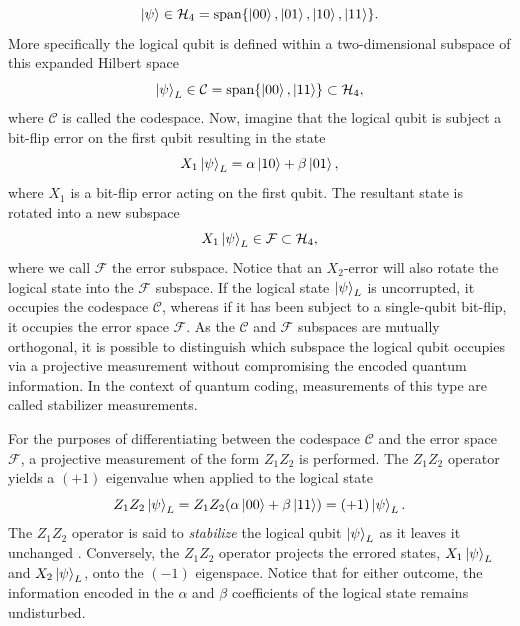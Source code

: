 \documentclass[]{arxiv}
\theoremstyle{plain}%
\theoremstyle{definition}
\theoremstyle{remark}
\begin{document}
%
\begin{equation}
\ket{\psi}\in \mathcal{H}_4 =\text{span}\{\ket{00},\ket{01},\ket{10},\ket{11}\}\rm.
\end{equation}
%
More specifically the logical qubit is defined within a two-dimensional subspace of this expanded Hilbert space
%
\begin{equation}
\ket{\psi}_L\in\mathcal{C} = {\rm span}\{\ket{00},\ket{11}\} \subset \mathcal{H}_4\rm,
\end{equation}
%
where $\mathcal{C}$ is called the codespace. Now, imagine that the logical qubit is subject a bit-flip error on the first qubit resulting in the state
%
\begin{equation}
X_1 \ket{\psi}_L=\alpha \ket{10} + \beta \ket{01}\rm,
\end{equation}
%
where $X_1$ is a bit-flip error acting on the first qubit. The resultant state is rotated into a new subspace
%
\begin{equation}
X_1\ket{\psi}_L \in \mathcal{F} \subset \mathcal{H}_4\rm,
\end{equation}
%
where we call $\mathcal{F}$ the error subspace. Notice that an $X_2$-error will also rotate the logical state into the $\mathcal{F}$ subspace. If the logical state $\ket{\psi}_L$ is uncorrupted, it occupies the codespace $\mathcal{C}$, whereas if it has been subject to a single-qubit bit-flip, it occupies the error space $\mathcal{F}$. As the $\mathcal{C}$ and $\mathcal{F}$ subspaces are mutually orthogonal, it is possible to distinguish which subspace the logical qubit occupies via a projective measurement without compromising the encoded quantum information. In the context of quantum coding, measurements of this type are called stabilizer measurements.

For the purposes of differentiating between the codespace $\mathcal{C}$ and the error space $\mathcal{F}$, a projective measurement of the form $Z_1Z_2$ is performed. The $Z_1Z_2$ operator yields a $(+1)$ eigenvalue when applied to the logical state
%
\begin{equation}
Z_1 Z_2 \ket{\psi}_L = Z_1Z_2(\alpha \ket{00}+\beta \ket{11})=(+1)\ket{\psi}_L\rm.
\end{equation}
%
The $Z_1Z_2$ operator is said to \textit{stabilize} the logical qubit $\ket{\psi}_L$ as it leaves it unchanged \cite{Gottesman09}. Conversely, the $Z_1Z_2$ operator projects the errored states, $X_1\ket{\psi}_L$ and $X_2\ket{\psi}_L$, onto the $(-1)$ eigenspace. Notice that for either outcome, the information encoded in the $\alpha$ and $\beta$ coefficients of the logical state remains undisturbed.
\end{document}
